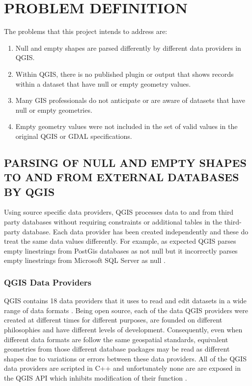 \documentclass[letterpaper,11pt,english]{sphinxmanual}
\begin{document}
\section{PROBLEM DEFINITION}
\label{\detokenize{concept:problem-definition}}
The problems that this project intends to address are:
\begin{enumerate}
\def\theenumi{\arabic{enumi}}
\def\labelenumi{\theenumi .}
\makeatletter\def\p@enumii{\p@enumi \theenumi .}\makeatother
\item {} 
Null and empty shapes are parsed differently by different data providers in QGIS.

\item {} 
Within QGIS, there is no published plugin or output that shows records within a dataset that have null or empty geometry values.

\item {} 
Many GIS professionals do not anticipate or are aware of datasets that have null or empty geometries.

\item {} 
Empty geometry values were not included in the set of valid values in the original QGIS or GDAL specifications.

\end{enumerate}


\subsection{PARSING OF NULL AND EMPTY SHAPES TO AND FROM EXTERNAL DATABASES BY QGIS}
\label{\detokenize{concept:parsing-of-null-and-empty-shapes-to-and-from-external-databases-by-qgis}}
Using source specific data providers, QGIS processes data to and from third party databases without requiring constraints or additional tables in the third-party database.  Each data provider has been created independently and these do treat the same data values differently.  For example, as expected QGIS parses empty linestrings from PostGis databases as not null but it incorrectly parses empty linestrings from Microsoft SQL Server as null .


\subsubsection{QGIS Data Providers}
\label{\detokenize{concept:qgis-data-providers}}
QGIS contains 18 data providers that it uses to read and edit datasets in a wide range of data formats .  Being open source, each of the data QGIS providers were created at different times for different purposes, are founded on different philosophies and have different levels of development.  Consequently, even when different data formats are follow the same geospatial standards, equivalent geometries from those different database packages may be read as different shapes due to variations or errors between these data providers.  All of the QGIS data providers are scripted in C++ and unfortunately none are are exposed in the QGIS API which inhibits modification of their function .
\end{document}
